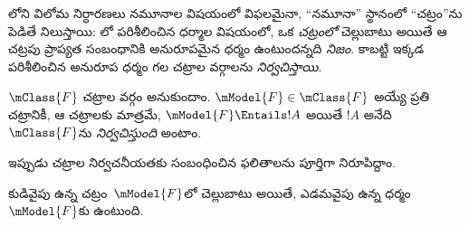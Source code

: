 \documentclass[../../../include/open-logic-section]{subfiles}
\begin{document}


లోని విలోమ నిర్ధారణలు
నమూనాల విషయంలో విఫలమైనా, ``నమూనా'' స్థానంలో
``చట్రం''ను పెడితే నిలుస్తాయి: లో
పరిశీలించిన ధర్మాల విషయంలో, ఒక \emph{చట్రంలో}
 చెల్లుబాటు అయితే ఆ చట్రపు
ప్రాప్యత సంబంధానికి అనురూపమైన ధర్మం ఉంటుందన్నది
\emph{నిజం}. కాబట్టి ఇక్కడ పరిశీలించిన 
అనురూప ధర్మం గల చట్రాల వర్గాలను \emph{నిర్వచిస్తాయి}.

\begin{defn}
  $\mClass{F}$ చట్రాల వర్గం అనుకుందాం.
  $\mModel{F} \in \mClass{F}$ అయ్యే ప్రతి చట్రానికీ,
  ఆ చట్రాలకు మాత్రమే, $\mModel{F} \Entails !A$ అయితే
  $!A$ అనేది~$\mClass{F}$ను \emph{నిర్వచిస్తుంది} అంటాం.
\end{defn}

ఇప్పుడు చట్రాల నిర్వచనీయతకు సంబంధించిన ఫలితాలను
పూర్తిగా నిరూపిద్దాం.

\begin{thm}
 కుడివైపు ఉన్న 
చట్రం~$\mModel{F}$లో చెల్లుబాటు అయితే, ఎడమవైపు
ఉన్న ధర్మం $\mModel{F}$కు ఉంటుంది.
\end{thm}
\end{document}
